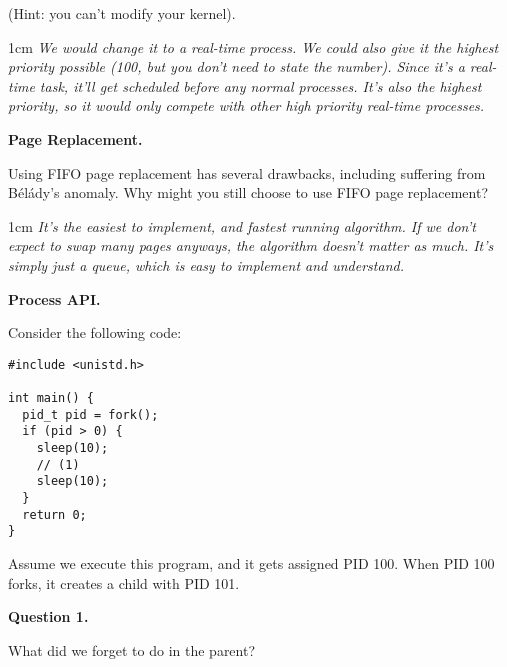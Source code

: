 \documentclass[12pt]{article}
\newenvironment{answer}{\begin{adjustwidth}{1cm}{}\itshape}{\end{adjustwidth}}
\begin{document}
(Hint: you can't modify your kernel).

\vspace{1em}

\begin{answer}
  We would change it to a real-time process. We could also give it the highest
  priority possible (100, but you don't need to state the number). Since it's
  a real-time task, it'll get scheduled before any normal processes. It's also
  the highest priority, so it would only compete with other high priority
  real-time processes.
\end{answer}

\newpage

\textbf{Page Replacement.}

\vspace{1em}

Using FIFO page replacement has several drawbacks, including suffering from
Bélády’s anomaly. Why might you still choose to use FIFO page replacement?

\vspace{1em}

\begin{answer}
  It's the easiest to implement, and fastest running algorithm. If we don't
  expect to swap many pages anyways, the algorithm doesn't matter as much.
  It's simply just a queue, which is easy to implement and understand.
\end{answer}

\newpage

\textbf{Process API.}

\vspace{1em}

Consider the following code:

\begin{lstlisting}
#include <unistd.h>

int main() {
  pid_t pid = fork();
  if (pid > 0) {
    sleep(10);
    // (1)
    sleep(10);
  }
  return 0;
}
\end{lstlisting}

Assume we execute this program, and it gets assigned PID 100. When PID 100
forks, it creates a child with PID 101.

\vspace{1em}

\textbf{Question 1.}

\vspace{1em}

What did we forget to do in the parent?
\end{document}
